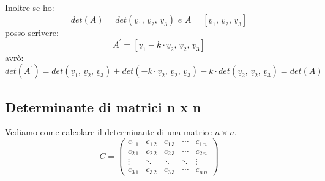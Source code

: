 \documentclass[a4paper,12pt, oneside]{book}
\begin{document}
Inoltre se ho:
$$det(A)=det(\underline{v}_1,\, \underline{v}_2,\, \underline{v}_3) \,\, e\,\, A=[\underline{v}_1,\, \underline{v}_2,\, \underline{v}_3]$$
posso scrivere:
$$A^{'}=[\underline{v}_1-k\cdot\underline{v}_2,\, \underline{v}_2,\, \underline{v}_3]$$
avrò:
$$det(A^{'})=det(\underline{v}_1,\, \underline{v}_2,\, \underline{v}_3)+det(-k\cdot\underline{v}_2,\, \underline{v}_2,\, \underline{v}_3)-k\cdot det(\underline{v}_2,\, \underline{v}_2,\, \underline{v}_3)=det(A)$$
\subsection{Determinante di matrici n x n}
Vediamo come calcolare il determinante di una matrice $n\times n$.
$$
	C=\left(\begin{matrix}
			c_{1\,1} & c_{1\,2} & c_{1\,3} & \cdots & c_{1\,n} \\
			c_{2\,1} & c_{2\,2} & c_{2\,3} & \cdots & c_{2\,n} \\
			\vdots   & \ddots   & \ddots   & \ddots & \vdots   \\
			c_{3\,1} & c_{3\,2} & c_{3\,3} & \cdots & c_{n\,n}
		\end{matrix}\right)
$$
\end{document}
